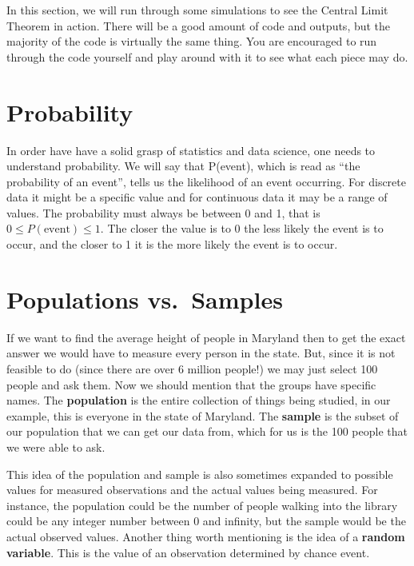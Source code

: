 \documentclass[
  letterpaper,
  DIV=11,
  numbers=noendperiod]{scrreprt}
\begin{document}
In this section, we will run through some simulations to see the Central
Limit Theorem in action. There will be a good amount of code and
outputs, but the majority of the code is virtually the same thing. You
are encouraged to run through the code yourself and play around with it
to see what each piece may do.

\section{Probability}\label{probability}

In order have have a solid grasp of statistics and data science, one
needs to understand probability. We will say that P(event), which is
read as ``the probability of an event'', tells us the likelihood of an
event occurring. For discrete data it might be a specific value and for
continuous data it may be a range of values. The probability must always
be between 0 and 1, that is \(0\leq P(\text{event})\leq 1\). The closer
the value is to 0 the less likely the event is to occur, and the closer
to 1 it is the more likely the event is to occur.

\section{Populations vs.~Samples}\label{populations-vs.-samples}

If we want to find the average height of people in Maryland then to get
the exact answer we would have to measure every person in the state.
But, since it is not feasible to do (since there are over 6 million
people!) we may just select 100 people and ask them. Now we should
mention that the groups have specific names. The \textbf{population} is
the entire collection of things being studied, in our example, this is
everyone in the state of Maryland. The \textbf{sample} is the subset of
our population that we can get our data from, which for us is the 100
people that we were able to ask.

This idea of the population and sample is also sometimes expanded to
possible values for measured observations and the actual values being
measured. For instance, the population could be the number of people
walking into the library could be any integer number between 0 and
infinity, but the sample would be the actual observed values. Another
thing worth mentioning is the idea of a \textbf{random variable}. This
is the value of an observation determined by chance event.
\end{document}
